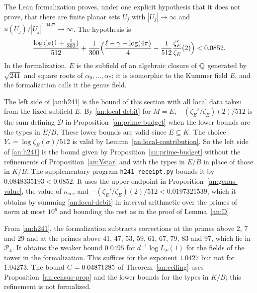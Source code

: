 \begin{remark}\label{an:lean-hypothesis}
The Lean formalization \cite{NaslundLean2026} proves, under one explicit
hypothesis that it does not prove, that there are finite planar sets $U_j$
with $|U_j|\to\infty$ and $u(U_j)/|U_j|^{1.0427}\to\infty$. The hypothesis is
\begin{equation}\label{an:h241}
 \frac{\log\zeta_E(1+\frac1{300})}{512}
 +\frac1{300}\Bigl(\frac{\ell-\gamma-\log(4\pi)}4
 -\frac1{512}\frac{\zeta_E'}{\zeta_E}(2)\Bigr)<0.0852.
\end{equation}
In the formalization, $E$ is the subfield of an algebraic closure of $\mathbb Q$
generated by $\sqrt{241}$ and square roots of $\alpha_0,\ldots,\alpha_7$; it
is isomorphic to the Kummer field $E$, and the formalization calls it the
genus field.

The left side of \eqref{an:h241} is the bound of this section with all
local data taken from the fixed subfield $E$. By \eqref{an:local-debit} for
$M=E$, $-(\zeta_E'/\zeta_E)(2)/512$ is the sum defining $\mathcal D$ in
Proposition~\ref{an:prime-budget} when the lower bounds are the types in
$E/B$. These lower bounds are valid since $E\subseteq K$. The choice
$Y_*=\log\zeta_E(\sigma)/512$ is valid by Lemma~\ref{an:local-contribution}.
So the left side of \eqref{an:h241} is the bound given by
Proposition~\ref{an:prime-budget} without the refinements of
Proposition~\ref{an:Ystar} and with the types in $E/B$ in place of those in
$K/B$. The supplementary program \texttt{h241\_receipt.py} bounds it by
$0.0848335193<0.0852$. It uses the upper endpoint in
Proposition~\ref{an:genus-value}, the value of $\kappa_\infty$, and
$-(\zeta_E'/\zeta_E)(2)/512<0.0197321539$, which it obtains by summing
\eqref{an:local-debit} in interval arithmetic over the primes of norm at
most $10^6$ and bounding the rest as in the proof of Lemma~\ref{an:D}.

From \eqref{an:h241}, the formalization subtracts corrections at the primes
above $2$, $7$ and $29$ and at the primes above $41$, $47$, $53$, $59$,
$61$, $67$, $79$, $83$ and $97$, which lie in $\mathcal P_4$. It obtains the
weaker bound $0.0495$ for $d^{-1}\log L_F(1)$ for the fields of the tower
in the formalization. This suffices for the exponent $1.0427$ but not for
$1.04273$. The bound $C=0.04871285$ of Theorem~\ref{an:ceiling} uses
Proposition~\ref{an:census-prop} and the lower bounds for the types in
$K/B$; this refinement is not formalized.
\end{remark}
